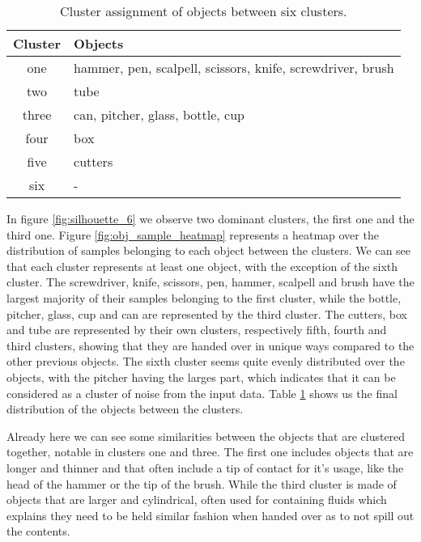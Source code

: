 \begin{table}
	\begin{tabular}{|c|l|}
		\hline
		Cluster & Objects \\
		\hline
		one   & hammer, pen, scalpell, scissors, knife, screwdriver, brush \\
		two   & tube \\
		three & can, pitcher, glass, bottle, cup \\
		four  & box \\
		five  & cutters \\
		six   & - \\
		\hline
	\end{tabular}
	\caption{Cluster assignment of objects between six clusters.}
	\label{tab:object_cluster_assign}
\end{table}

In figure \ref{fig:silhouette_6} we observe two dominant clusters, the first one and the third one. Figure \ref{fig:obj_sample_heatmap} represents a heatmap over the distribution of samples belonging to each object between the clusters. We can see that each cluster represents at least one object, with the exception of the sixth cluster. The screwdriver, knife, scissors, pen, hammer, scalpell and brush have the largest majority of their samples belonging to the first cluster, while the bottle, pitcher, glass, cup and can are represented by the third cluster. The cutters, box and tube are represented by their own clusters, respectively fifth, fourth and third clusters, showing that they are handed over in unique ways compared to the other previous objects. The sixth cluster seems quite evenly distributed over the objects, with the pitcher having the larges part, which indicates that it can be considered as a cluster of noise from the input data. Table \ref{tab:object_cluster_assign} shows us the final distribution of the objects between the clusters.

Already here we can see some similarities between the objects that are clustered together, notable in clusters one and three. The first one includes objects that are longer and thinner and that often include a tip of contact for it's usage, like the head of the hammer or the tip of the brush. While the third cluster is made of objects that are larger and cylindrical, often used for containing fluids which explains they need to be held similar fashion when handed over as to not spill out the contents.





